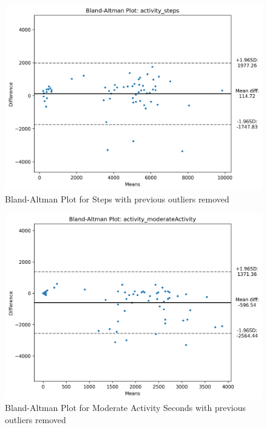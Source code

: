 \begin{figure}
    
    \centering
    \includegraphics[width=\textwidth,keepaspectratio]{../images/bland_altman_steps_no_outliers.png}
    \caption{Bland-Altman Plot for Steps with previous outliers removed}
    \label{fig:blandAltmanStepsNoOutliers}
    
\end{figure}
\begin{figure}
    
    \centering
    \includegraphics[width=\textwidth,keepaspectratio]{../images/bland_altman_moderateActivity_no_outliers.png}
    \caption{Bland-Altman Plot for Moderate Activity Seconds with previous outliers removed}
    \label{fig:blandAltmanModerateActivityNoOutliers}
    
\end{figure}


